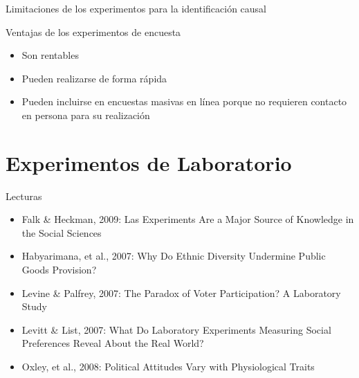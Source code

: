 \documentclass[
  ignorenonframetext,
]{beamer}
\providecommand{\tightlist}{%
  \setlength{\itemsep}{0pt}\setlength{\parskip}{0pt}}
\begin{document}
\begin{frame}{Limitaciones de los experimentos para la identificación
causal}
\protect\hypertarget{limitaciones-de-los-experimentos-para-la-identificaciuxf3n-causal}{}
\end{frame}

\begin{frame}{Ventajas de los experimentos de encuesta}
\protect\hypertarget{ventajas-de-los-experimentos-de-encuesta}{}
\begin{itemize}
\tightlist
\item
  Son rentables
\item
  Pueden realizarse de forma rápida
\item
  Pueden incluirse en encuestas masivas en línea porque no requieren
  contacto en persona para su realización
\end{itemize}
\end{frame}

\hypertarget{experimentos-de-laboratorio}{%
\section{Experimentos de
Laboratorio}\label{experimentos-de-laboratorio}}

\begin{frame}{Lecturas}
\protect\hypertarget{lecturas-3}{}
\begin{itemize}
\tightlist
\item
  Falk \& Heckman, 2009: Las Experiments Are a Major Source of Knowledge
  in the Social Sciences
\item
  Habyarimana, et al., 2007: Why Do Ethnic Diversity Undermine Public
  Goods Provision?
\item
  Levine \& Palfrey, 2007: The Paradox of Voter Participation? A
  Laboratory Study
\item
  Levitt \& List, 2007: What Do Laboratory Experiments Measuring Social
  Preferences Reveal About the Real World?
\item
  Oxley, et al., 2008: Political Attitudes Vary with Physiological
  Traits
\end{itemize}
\end{frame}
\end{document}
